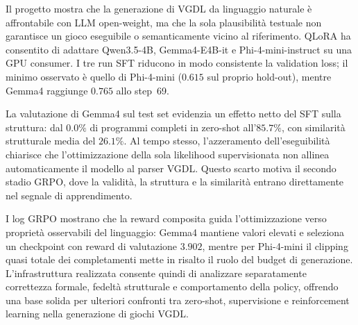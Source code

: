 \documentclass[final,5p,times,twocolumn]{elsarticle}
\begin{document}
Il progetto mostra che la generazione di VGDL da linguaggio naturale è affrontabile con LLM open-weight, ma che la sola plausibilità testuale non garantisce un gioco eseguibile o semanticamente vicino al riferimento. QLoRA ha consentito di adattare Qwen3.5-4B, Gemma4-E4B-it e Phi-4-mini-instruct su una GPU consumer. I tre run SFT riducono in modo consistente la validation loss; il minimo osservato è quello di Phi-4-mini ($0.615$ sul proprio hold-out), mentre Gemma4 raggiunge $0.765$ allo step~69.

La valutazione di Gemma4 sul test set evidenzia un effetto netto del SFT sulla struttura: dal $0.0\%$ di programmi completi in zero-shot all'$85.7\%$, con similarità strutturale media del $26.1\%$. Al tempo stesso, l'azzeramento dell'eseguibilità chiarisce che l'ottimizzazione della sola likelihood supervisionata non allinea automaticamente il modello al parser VGDL. Questo scarto motiva il secondo stadio GRPO, dove la validità, la struttura e la similarità entrano direttamente nel segnale di apprendimento.

I log GRPO mostrano che la reward composita guida l'ottimizzazione verso proprietà osservabili del linguaggio: Gemma4 mantiene valori elevati e seleziona un checkpoint con reward di valutazione $3.902$, mentre per Phi-4-mini il clipping quasi totale dei completamenti mette in risalto il ruolo del budget di generazione. L'infrastruttura realizzata consente quindi di analizzare separatamente correttezza formale, fedeltà strutturale e comportamento della policy, offrendo una base solida per ulteriori confronti tra zero-shot, supervisione e reinforcement learning nella generazione di giochi VGDL.



\end{document}
